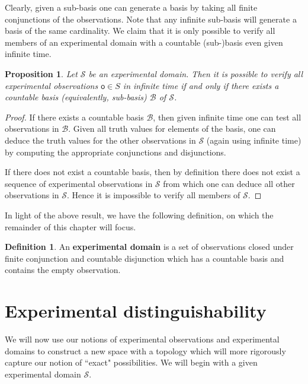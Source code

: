 \documentclass[review]{elsarticle}
\theoremstyle{plain}%
\newtheorem{prop}[thm]{Proposition}
\theoremstyle{definition}
\newtheorem{defn}{Definition}[section]
\theoremstyle{remark}
\begin{document}
Clearly, given a sub-basis one can generate a basis by taking all finite conjunctions of the observations. Note that any infinite sub-basis will generate a basis of the same cardinality. We claim that it is only possible to verify all members of an experimental domain with a countable (sub-)basis even given infinite time. 

\begin{prop}
Let $\mathcal{S}$ be an experimental domain. Then it is possible to verify all experimental observations $\mathsf{o}\in S$ in infinite time if and only if there exists a countable basis (equivalently, sub-basis) $\mathcal{B}$ of $\mathcal{S}$. 
\end{prop}
\begin{proof}
If there exists a countable basis $\mathcal{B}$, then given infinite time one can test all observations in $\mathcal{B}$. Given all truth values for elements of the basis, one can deduce the truth values for the other observations in $\mathcal{S}$ (again using infinite time) by computing the appropriate conjunctions and disjunctions. 

If there does not exist a countable basis, then by definition there does not exist a sequence of experimental observations in $\mathcal{S}$ from which one can deduce all other observations in $\mathcal{S}$. Hence it is impossible to verify all members of $\mathcal{S}$.
\end{proof}

In light of the above result, we have the following definition, on which the remainder of this chapter will focus. 

\begin{defn}
An \textbf{experimental domain} is a set of observations closed under finite conjunction and countable disjunction which has a countable basis and contains the empty observation. 
\end{defn}



\section{Experimental distinguishability}



We will now use our notions of experimental observations and experimental domains to construct a new space with a topology which will more rigorously capture our notion of ``exact" possibilities. We will begin with a given experimental domain $\mathcal{S}$. 
\end{document}

